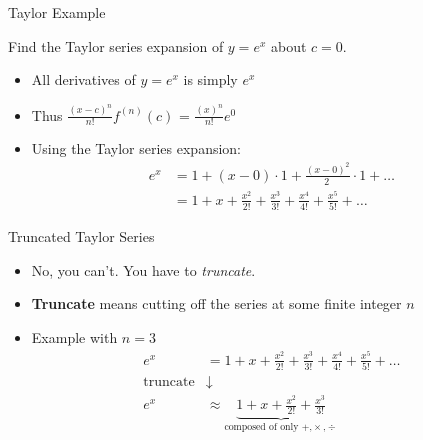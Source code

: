 \documentclass[10pt]{beamer}
\begin{document}
\begin{frame}{Taylor Example}

\begin{example}[$e^x$]
    Find the Taylor series expansion of $y=e^x$ about $c=0$. 
\end{example}
\bigskip
\begin{itemize}
    \item All derivatives of $y=e^x$ is simply $e^x$
    \item Thus $\frac{(x-c)^n}{n!} f^{(n)}(c)$ = $\frac{(x)^n}{n!} e^0$
    \item Using the Taylor series expansion:
    \begin{align*}
    e^x &= 1 + (x-0)\cdot 1 + \frac{(x-0)^2}{2~} \cdot 1 + \dots\\
          & = 1 + x + \frac{x^2}{2!} + \frac{x^3}{3!} + \frac{x^4}{4!} + \frac{x^5}{5!} + \dots
    \end{align*}


\end{itemize}
\end{frame}
\begin{frame}{Truncated Taylor Series}


\begin{itemize}
    \item No, you can't. You have to \textit{truncate}.

    \item \textbf{Truncate} means cutting off the series at some finite integer $n$

    \item Example with $n=3$
    \begin{align*}
       e^x &= 1 + x + \frac{x^2}{2!} + \frac{x^3}{3!} + \frac{x^4}{4!} + \frac{x^5}{5!} + \dots\\
      \text{truncate}  & \downarrow \\
     e^x &\approx  \underbrace{1 + x + \frac{x^2}{2!} + \frac{x^3}{3!}}_{\text{composed of only +,$\times$,$\div$}}
    \end{align*}



\end{itemize}
\end{frame}
\end{document}
